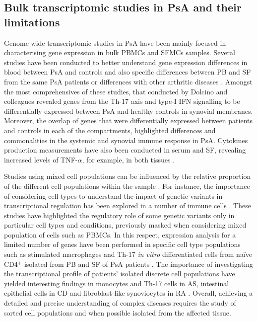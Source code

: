 \subsection{Bulk transcriptomic studies in PsA and their limitations}

Genome-wide transcriptomic studies in PsA have been mainly focused in characterising gene expression in bulk PBMCs and SFMCs samples. Several studies have been conducted to better understand gene expression differences in blood between PsA and controls and also specific differences between PB and SF from the same PsA patients or differences with other arthritic diseases \parencite{Stoeckman2006, Batiwalla2005, Gu2002, Dolcino2015}. Amongst the most comprehensives of these studies, that conducted by Dolcino and colleagues revealed genes from the Th-17 axis and type-I IFN signalling to be differentially expressed between PsA and healthy controls in synovial membranes. Moreover, the overlap of genes that were differentially expressed between patients and controls in each of the compartments, highlighted differences and commonalities in the systemic and synovial immune response in PsA. %
Cytokines production measurements have also been conducted in serum and SF, revealing increased levels of TNF-$\alpha$, for example, in both tissues \parencite{Ritchlin1999,Li2017}. 

Studies using mixed cell populations can be influenced by the relative proportion of the different cell populations within the sample \parencite{Whitney2003}. For instance, the importance of considering cell types to understand the impact of genetic variants in transcriptional regulation has been explored in a number of immune cells \parencite{Fairfax2012, Fairfax2014, Raj2014, Peters2016, Kasela2017}. These studies have highlighted the regulatory role of some genetic variants only in particular cell types and conditions, previously masked when considering mixed population of cells such as PBMCs. In this respect, expression analysis for a limited number of genes have been performed in specific cell type populations such as stimulated macrophages and Th-17 \textit{in vitro} differentiated cells from na\"{i}ve CD4$^+$ isolated from PB and SF of PsA patients \parencite{Antoniv2006, Leipe2010}. The importance of investigating the transcriptional profile of patients' isolated discrete cell populations have yielded interesting findings in monocytes and Th-17 cells in AS, intestinal epithelial cells in CD and fibroblast-like synoviocytes in RA \parencite{Al-Mossawi2017,Smith2008, Howell2018, Ai2016}. Overall, achieving a detailed and precise understanding of complex diseases requires the study of sorted cell populations and when possible isolated from the affected tissue.  


